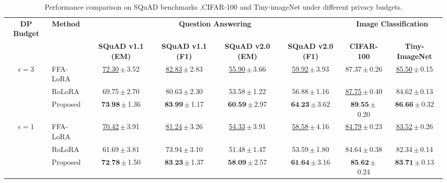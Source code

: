 \begin{table}[h]
\centering
\scriptsize
\setlength{\tabcolsep}{2pt}
\renewcommand{\arraystretch}{1.05}
\newcommand{\std}[1]{\,{\tiny$\pm$}\,\tiny #1}

\caption{Performance comparison on SQuAD benchmarks \cite{rajpurkar2016squad, rajpurkar2018know},CIFAR-100 \cite{krizhevsky2009learning} and Tiny-imageNet \cite{deng2009imagenet} under different privacy budgets.}
\label{tab:squad_vision_dp}
\begin{tabular}{c l cc cc cc}
\toprule
\textbf{DP Budget} & \textbf{Method} 
& \multicolumn{4}{c}{\textbf{Question Answering}} 
& \multicolumn{2}{c}{\textbf{Image Classification}} \\

\cmidrule(lr){3-6} \cmidrule(lr){7-8}
& 
& \textbf{SQuAD v1.1 (EM)} & \textbf{SQuAD v1.1 (F1)} 
& \textbf{SQuAD v2.0 (EM)} & \textbf{SQuAD v2.0 (F1)} 
& \textbf{CIFAR-100} & \textbf{Tiny-ImageNet} \\

\midrule

\multirow{3}{*}{$\epsilon = 3$}
& FFA-LoRA  
& \underline{72.30}\std{3.52} & \underline{82.83}\std{2.83} 
& \underline{55.90}\std{3.66} & \underline{59.92}\std{3.93} 
& 87.37\std{0.26} & \underline{85.50}\std{0.15} \\

& RoLoRA    
& 69.75\std{2.70} & 80.63\std{2.30} 
& 53.58\std{1.22} & 56.88\std{1.16} 
& \underline{87.75}\std{0.40} & 84.62\std{0.13} \\

& Proposed  
& $\textbf{73.98}$\std{1.36} & $\textbf{83.99}$\std{1.17} 
& $\textbf{60.59}$\std{2.97} & $\textbf{64.23}$\std{3.62} 
& $\textbf{89.55}$\std{0.20} & $\textbf{86.66}$\std{0.32} \\

\midrule

\multirow{3}{*}{$\epsilon = 1$}
& FFA-LoRA  
& \underline{70.42}\std{3.91} & \underline{81.24}\std{3.26} 
& \underline{54.33}\std{3.91} & \underline{58.58}\std{4.16} 
& \underline{84.79}\std{0.23} & \underline{83.52}\std{0.26} \\

& RoLoRA    
& 61.69\std{3.81} & 73.94\std{3.10} 
& 51.48\std{1.47} & 53.59\std{1.80} 
& 84.64\std{0.38} & 82.34\std{0.14} \\

& Proposed  
& $\textbf{72.78}$\std{1.50} & $\textbf{83.23}$\std{1.37} 
& $\textbf{58.09}$\std{2.57} & $\textbf{61.64}$\std{3.16} 
& $\textbf{85.62}$\std{0.24} & $\textbf{83.71}$\std{0.13} \\

\bottomrule
\end{tabular}
\vspace{-0pt}
\end{table}

